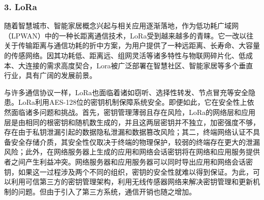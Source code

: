 \subsubsection{\textcolor{myblue}{\textbf{3. LoRa}}}
\par 随着智慧城市、智能家居概念兴起与相关应用逐渐落地，作为低功耗广域网（LPWAN）中的一种长距离通信技术，LoRa受到越来越多的青睐。它一改以往关于传输距离与通信功耗的折中方案，为用户提供了一种远距离、长寿命、大容量的传感网络。因其功耗低、距离远、组网灵活等诸多特性与物联网碎片化、低成本、大连接的需求高度契合，Lora被广泛部署在智慧社区、智能家居等多个垂直行业，具有广阔的发展前景。
\par 与许多通信协议一样，LoRa也面临着诸如窃听、选择性转发、节点冒充等安全隐患\cite{zhou2008securing}。LoRa利用AES-128位的密钥机制保障系统安全。即便如此，它在安全性上依然面临诸多问题和挑战。首先，密钥管理薄弱且存在风险，LoRa的网络层和应用层是由相同的根密钥和随机数生成的，并且这两层密钥并不独立，加密强度不够，存在由于私钥泄漏引起的数据隐私泄漏和数据篡改风险；其二，终端网络认证不具备安全存储介质，其安全性仅取决于终端的物理保护，较弱的终端存在更大的泄漏风险；此外，在网络服务器上生成的应用和网络会话密钥将在网络和应用服务提供者之间产生利益冲突。网络服务器和应用服务器可以同时导出应用和网络会话密钥，如果这一过程涉及两个不同的组织，密钥的安全性就难以得到保证。为此，可以利用可信第三方的密钥管理架构，利用无线传感器网络来解决密钥管理和更新机制的问题\cite{seo2014effective,agrawal2012a}。但由于引入了第三方系统，通信开销也随之增加。

